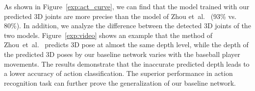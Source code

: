 \documentclass[10pt,twocolumn,letterpaper]{article}
\def\etal{et~al.\xspace}
\begin{document}
As shown in Figure~\ref{exp:act_curve}, we can find that the model trained with our predicted 3D joints are more precise than the model of Zhou \etal~\cite{zhou2017towards} (93\% vs. 80\%).
In addition, we analyze the difference between the detected 3D joints of the two models.
Figure~\ref{exp:video} shows an example that the method of Zhou~\etal~\cite{zhou2017towards} predicts 3D pose at almost the same depth level, while the depth of the predicted 3D poses by our baseline network varies with the baseball player movements.
The results demonstrate that the inaccurate predicted depth leads to a lower accuracy of action classification. 
The superior performance in action recognition task can further prove the generalization of our baseline network.



\begin{figure}[!t]
\footnotesize
\centering
\renewcommand{\tabcolsep}{1pt} \renewcommand{\arraystretch}{1} \begin{center}
\end{center}
\end{figure}
\end{document}

